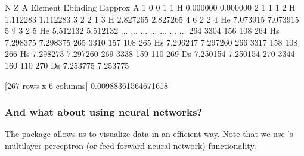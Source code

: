 \documentclass[letterpaper,10pt,english]{sphinxmanual}
\begin{document}
\noindent{}

\begin{sphinxVerbatim}[commandchars=\\\{\}]
            N    Z    A Element  Ebinding   Eapprox
A                                                  
1   0       0    1    1       H  0.000000  0.000000
2   1       1    1    2       H  1.112283  1.112283
3   2       2    1    3       H  2.827265  2.827265
4   6       2    2    4      He  7.073915  7.073915
5   9       3    2    5      He  5.512132  5.512132
...       ...  ...  ...     ...       ...       ...
264 3304  156  108  264      Hs  7.298375  7.298375
265 3310  157  108  265      Hs  7.296247  7.297260
266 3317  158  108  266      Hs  7.298273  7.297260
269 3338  159  110  269      Ds  7.250154  7.250154
270 3344  160  110  270      Ds  7.253775  7.253775

[267 rows x 6 columns]
0.00988361564671618
\end{sphinxVerbatim}


\subsubsection{And what about using neural networks?}
\label{\detokenize{chapter2:and-what-about-using-neural-networks}}
The  package allows us to visualize data in an efficient way. Note that we use ’s multi\sphinxhyphen{}layer perceptron (or feed forward neural network)
functionality.
\end{document}
